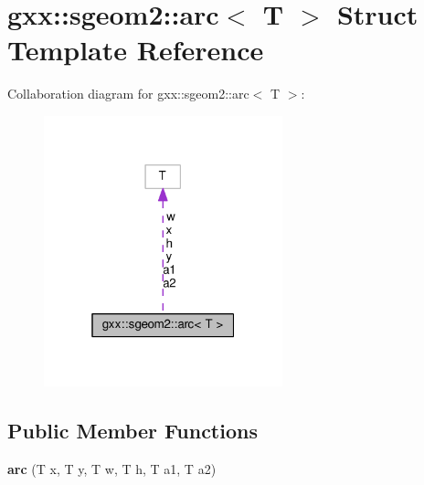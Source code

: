 \hypertarget{structgxx_1_1sgeom2_1_1arc}{}\section{gxx\+:\+:sgeom2\+:\+:arc$<$ T $>$ Struct Template Reference}
\label{structgxx_1_1sgeom2_1_1arc}


Collaboration diagram for gxx\+:\+:sgeom2\+:\+:arc$<$ T $>$\+:
\nopagebreak
\begin{figure}[H]
\begin{center}
\leavevmode
\includegraphics[width=196pt]{structgxx_1_1sgeom2_1_1arc__coll__graph}
\end{center}
\end{figure}
\subsection*{Public Member Functions}
\begin{DoxyCompactItemize}
\item 
{\bfseries arc} (T x, T y, T w, T h, T a1, T a2)\hypertarget{structgxx_1_1sgeom2_1_1arc_afe3a2e6dc498bd2bd370d54d83c89e8c}{}\label{structgxx_1_1sgeom2_1_1arc_afe3a2e6dc498bd2bd370d54d83c89e8c}

\end{DoxyCompactItemize}

